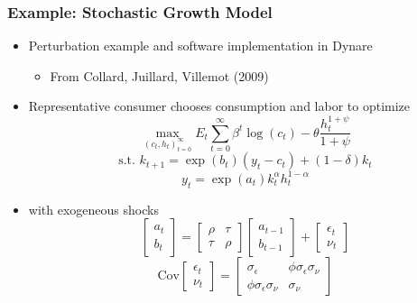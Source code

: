 \documentclass[bigger,handout]{beamer}
\begin{document}
\begin{frame}
\frametitle{Example: Stochastic Growth Model}
\begin{itemize}
\item Perturbation example and software implementation in Dynare
\begin{itemize}
\item From Collard, Juillard, Villemot (2009)
\end{itemize}
\item Representative consumer chooses consumption and labor to optimize
\begin{equation*}
\underset{(c_t,h_t)_{t=0}^{\infty}}{\max}E_{t}\sum_{t=0}^{\infty}\beta^{t}\log(c_t)-\theta\frac{h_t^{1+\psi}}{1+\psi}
\end{equation*}
\begin{equation*}
\text{s.t. }k_{t+1}=\exp(b_t)(y_t-c_t)+(1-\delta)k_t
\end{equation*}
\begin{equation*}
y_{t}=\exp(a_t)k_{t}^{\alpha}h_{t}^{1-\alpha}
\end{equation*}
\item with exogeneous shocks
\begin{equation*}
\begin{bmatrix} a_{t} \\ b_{t} \end{bmatrix} = 
\begin{bmatrix} \rho & \tau \\ \tau & \rho \end{bmatrix} \begin{bmatrix} a_{t-1} \\ b_{t-1} \end{bmatrix} +
\begin{bmatrix} \epsilon_t \\ \nu_t \end{bmatrix}
\end{equation*}
\begin{equation*}
\text{Cov}\begin{bmatrix} \epsilon_t \\ \nu_t \end{bmatrix} =
\begin{bmatrix} \sigma_\epsilon & \phi\sigma_\epsilon\sigma_\nu \\ \phi\sigma_\epsilon\sigma_\nu & \sigma_\nu \end{bmatrix}
\end{equation*}

\end{itemize}
\end{frame}
\end{document}
